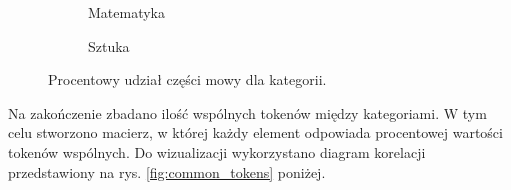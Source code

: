 \documentclass{article}
\begin{document}
\begin{figure}[H]
    \centering
    \begin{subfigure}{.38\textwidth}
        \centering
        \caption{Matematyka}
        \label{fig:math_pos}
    \end{subfigure}%
    \begin{subfigure}{.6\textwidth}
        \centering
        \caption{Sztuka}
        \label{fig:art_pos}
    \end{subfigure}
    \caption{Procentowy udział części mowy dla kategorii.}
    \label{fig:duo_cat_pos}
\end{figure}

Na zakończenie zbadano ilość wspólnych tokenów między kategoriami. W tym celu stworzono macierz, w której
każdy element odpowiada procentowej wartości tokenów wspólnych. Do wizualizacji wykorzystano diagram korelacji przedstawiony na rys. \ref{fig:common_tokens} poniżej.
\end{document}
